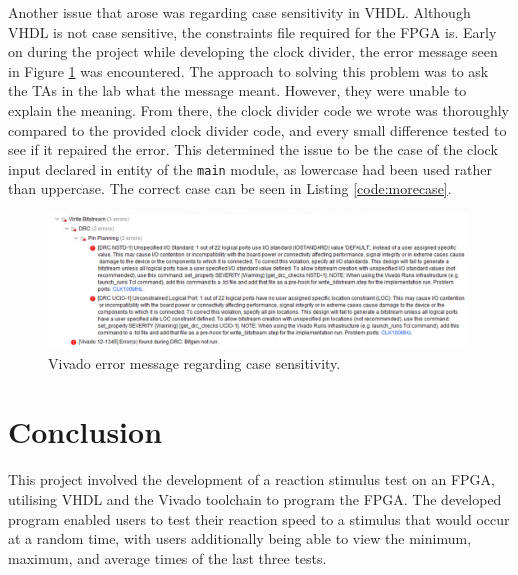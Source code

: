 \documentclass[11pt]{article}
\begin{document}
Another issue that arose was regarding case sensitivity in VHDL. Although VHDL is not case sensitive, the constraints file required for the FPGA is. Early on during the project while developing the clock divider, the error message seen in Figure \ref{fig:error} was encountered. The approach to solving this problem was to ask the TAs in the lab what the message meant. However, they were unable to explain the meaning. From there, the clock divider code we wrote was thoroughly compared to the provided clock divider code, and every small difference tested to see if it repaired the error. This determined the issue to be the case of the clock input declared in entity of the \texttt{main} module, as lowercase had been used rather than uppercase. The correct case can be seen in Listing \ref{code:morecase}.

\begin{figure}[H]
	\centering
	\includegraphics[width=0.99\textwidth]{error.png}
	\caption{Vivado error message regarding case sensitivity.}
	\label{fig:error}
\end{figure}

\section{Conclusion}


This project involved the development of a reaction stimulus test on an FPGA, utilising VHDL and the Vivado toolchain to program the FPGA. The developed program enabled users to test their reaction speed to a stimulus that would occur at a random time, with users additionally being able to view the minimum, maximum, and average times of the last three tests.
\end{document}
